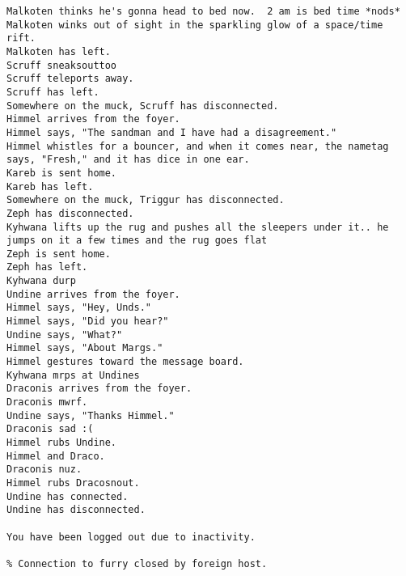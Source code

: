 \begin{verbatim}
Malkoten thinks he's gonna head to bed now.  2 am is bed time *nods*
Malkoten winks out of sight in the sparkling glow of a space/time rift.
Malkoten has left.
Scruff sneaksouttoo
Scruff teleports away.
Scruff has left.
Somewhere on the muck, Scruff has disconnected.
Himmel arrives from the foyer.
Himmel says, "The sandman and I have had a disagreement."
Himmel whistles for a bouncer, and when it comes near, the nametag says, "Fresh," and it has dice in one ear.
Kareb is sent home.
Kareb has left.
Somewhere on the muck, Triggur has disconnected.
Zeph has disconnected.
Kyhwana lifts up the rug and pushes all the sleepers under it.. he jumps on it a few times and the rug goes flat
Zeph is sent home.
Zeph has left.
Kyhwana durp
Undine arrives from the foyer.
Himmel says, "Hey, Unds."
Himmel says, "Did you hear?"
Undine says, "What?"
Himmel says, "About Margs."
Himmel gestures toward the message board.
Kyhwana mrps at Undines
Draconis arrives from the foyer.
Draconis mwrf.
Undine says, "Thanks Himmel."
Draconis sad :(
Himmel rubs Undine.
Himmel and Draco.
Draconis nuz.
Himmel rubs Dracosnout.
Undine has connected.
Undine has disconnected.

You have been logged out due to inactivity.

% Connection to furry closed by foreign host.
\end{verbatim}
\newpage

